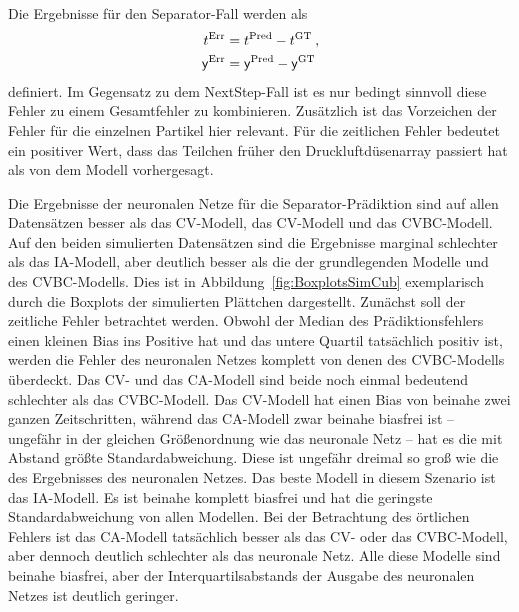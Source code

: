 Die Ergebnisse für den Separator-Fall werden als
\begin{align*}
    t{^{\text{Err}}} &=  t{^{\text{Pred}}} -  t{^{\text{GT}}} \: ,\\
    \mathsf{y}{^{\text{Err}}} &=  \mathsf{y}{^{\text{Pred}}} -  \mathsf{y}{^{\text{GT}}}
\end{align*}
definiert.
Im Gegensatz zu dem NextStep-Fall ist es nur bedingt sinnvoll diese Fehler zu einem Gesamtfehler zu kombinieren.
Zusätzlich ist das Vorzeichen der Fehler für die einzelnen Partikel hier relevant.
Für die zeitlichen Fehler bedeutet ein positiver Wert, 
dass das Teilchen früher den Druckluftdüsenarray passiert hat als von dem Modell vorhergesagt. 


Die Ergebnisse der neuronalen Netze für die Separator-Prädiktion sind auf allen Datensätzen besser als das CV-Modell, das CV-Modell und das CVBC-Modell.
Auf den beiden simulierten Datensätzen sind die Ergebnisse marginal schlechter als das IA-Modell, 
aber deutlich besser als die der grundlegenden Modelle und des CVBC-Modells.
Dies ist in Abbildung~\ref{fig:BoxplotsSimCub} exemplarisch durch die Boxplots der simulierten Plättchen dargestellt.
Zunächst soll der zeitliche Fehler betrachtet werden.
Obwohl der Median des Prädiktionsfehlers einen kleinen Bias ins Positive hat und das untere Quartil tatsächlich positiv ist, werden die Fehler des neuronalen Netzes komplett von denen des CVBC-Modells überdeckt.
Das CV- und das CA-Modell sind beide noch einmal bedeutend schlechter als das CVBC-Modell.
Das CV-Modell hat einen Bias von beinahe zwei ganzen Zeitschritten, während das CA-Modell zwar beinahe biasfrei ist -- ungefähr in der gleichen Größenordnung wie das neuronale Netz -- hat es die mit Abstand größte Standardabweichung.
Diese ist ungefähr dreimal so groß wie die des Ergebnisses des neuronalen Netzes.
Das beste Modell in diesem Szenario ist das IA-Modell.
Es ist beinahe komplett biasfrei und hat die geringste Standardabweichung von allen Modellen.
Bei der Betrachtung des örtlichen Fehlers ist das CA-Modell tatsächlich besser als das CV- oder das CVBC-Modell, aber dennoch deutlich schlechter als das neuronale Netz.
Alle diese Modelle sind beinahe biasfrei, aber der Interquartilsabstands der Ausgabe des neuronalen Netzes ist deutlich geringer. 

